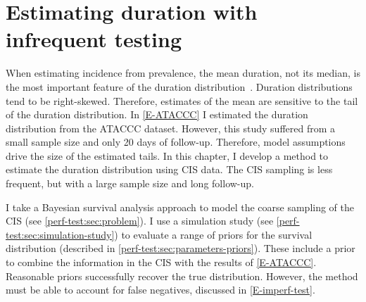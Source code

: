 \documentclass[thesis.tex]{subfiles}
\begin{document}

\chapter{Estimating duration with infrequent testing} \label{perf-test}

When estimating incidence from prevalence, the mean duration, not its median, is the most important feature of the duration distribution~\autocite{freemanPrevalence}.
Duration distributions tend to be right-skewed.
Therefore, estimates of the mean are sensitive to the tail of the duration distribution.
In \cref{E-ATACCC} I estimated the duration distribution from the ATACCC dataset.
However, this study suffered from a small sample size and only 20 days of follow-up.
Therefore, model assumptions drive the size of the estimated tails.
In this chapter, I develop a method to estimate the duration distribution using CIS data.
The CIS sampling is less frequent, but with a large sample size and long follow-up.

I take a Bayesian survival analysis approach to model the coarse sampling of the CIS (see \cref{perf-test:sec:problem}).
I use a simulation study (see \cref{perf-test:sec:simulation-study}) to evaluate a range of priors for the survival distribution (described in \cref{perf-test:sec:parameters-priors}).
These include a prior to combine the information in the CIS with the results of \cref{E-ATACCC}.
Reasonable priors successfully recover the true distribution.
However, the method must be able to account for false negatives, discussed in \cref{E-imperf-test}.
\end{document}
